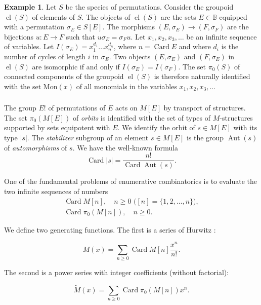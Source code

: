 \documentclass{amsart}
\theoremstyle{definition}
\newtheorem{ex}{Example}
\theoremstyle{remark}
\newcommand{\B}{\mathbb{B}}
\DeclareMathOperator{\el}{el}
\DeclareMathOperator{\Card}{Card}
\DeclareMathOperator{\Aut}{Aut}
\newcommand{\Mon}{\mathrm{Mon}}
\newcommand{\unl}[1]{\tilde{#1}}
\begin{document}
\begin{ex}
  Let $S$ be the species of permutations. Consider the groupoid $\el
  (S)$ of elements of $S$. The objects of $\el (S)$ are the sets $E
  \in \B$ equipped with a permutation $\sigma_E \in S [E]$. The
  morphisms $(E, \sigma_E) \to (F, \sigma_F)$ are the bijections $u: E
  \to F$ such that $u\sigma_E = \sigma_F u$. Let $x_1, x_2, x_3,
  \dots$ be an infinite sequence of variables.  Let $I (\sigma_E) =
  x_1^{d_1} \dots x_n^{d_n}$, where $n = \Card E$ and where $d_i$ is
  the number of cycles of length $i$ in $\sigma_E$. Two objects $(E,
  \sigma_E)$ and $(F, \sigma_E)$ in $\el (S)$ are isomorphic if and
  only if $I (\sigma_E) = I (\sigma_F)$. The set $\pi_0(S)$ of
  connected components of the groupoid $\el (S)$ is therefore
  naturally identified with the set $\Mon(x)$ of all monomials in the
  variables $x_1, x_2, x_3, \dots$
\end{ex}

\subsubsection{}
The group $E!$ of permutations of $E$ acts on $M [E]$ by transport
of structures. The set $\pi_0 (M [E])$ of \emph{orbits} is identified
with the set of types of $M$-structures supported by sets equipotent
with $E$. We identify the orbit of $s \in M[E]$ with its type
$|s|$. The \emph{stabilizer} subgroup of an element $s \in M [E]$ is
the group $\Aut (s)$ of \emph{automorphisms} of $s$. We have the
well-known formula \[ \Card |s| = \frac{n!}{\Card \Aut(s)}. \]

One of the fundamental problems of enumerative combinatorics is to
evaluate the two infinite sequences of numbers
\begin{gather}
  \Card M[n], \quad \text{$n \geq 0$ ($[n] = \{1, 2, \dots, n\}$)}, \\
  \Card \pi_0(M[n]), \quad n \geq 0.
\end{gather}

We define two generating functions. The first is a series of Hurwitz
\citep{comtet1974combinatorics}:

\begin{equation}
  M(x) = \sum_{n \geq 0} \Card M[n] \frac{x^n}{n!}.
\end{equation}

The second is a power series with integer coefficients (without
factorial):

\begin{equation}
  \unl M(x) = \sum_{n \geq 0} \Card \pi_0(M[n]) x^n.
\end{equation}
\end{document}
